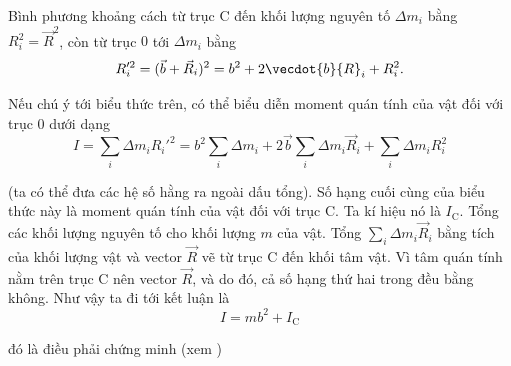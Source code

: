 Bình phương khoảng cách từ trục C đến khối lượng nguyên tố $\Delta m_i$ bằng $R_i^2=\vec{R}^2$, còn từ trục $0$ tới $\Delta m_i$ bằng
\begin{equation*}
R_i'^2 = (\vec{b} + \vec{R}_i)^2 = b^2 + 2\vecdot{b}{R}_i + R_i^2.
\end{equation*}

\noindent
Nếu chú ý tới biểu thức trên, có thể biểu diễn moment quán tính của vật đối với trục $0$ dưới dạng
\begin{equation}\label{eq:5_24}
I = \sum_i \Delta m_i R_i'^2 = b^2 \sum_i \Delta m_i + 2\vec{b} \sum_i \Delta m_i \vec{R}_i + \sum_i \Delta m_i R_i^2
\end{equation}

\noindent
(ta có thể đưa các hệ số hằng ra ngoài dấu tổng). Số hạng cuối cùng của biểu thức này là moment quán tính của vật đối với trục C. Ta kí hiệu nó là $I_{\text{C}}$. Tổng các khối lượng nguyên tố cho khối lượng $m$ của vật. Tổng $\sum_i\Delta m_i\vec{R}_i$ bằng tích của khối lượng vật và vector $\vec{R}$ vẽ từ trục C đến khối tâm vật. Vì tâm quán tính nằm trên trục C nên vector $\vec{R}$, và do đó, cả số hạng thứ hai trong  đều bằng không. Như vậy ta đi tới kết luận là
\begin{equation*}
I = mb^2 + I_{\text{C}}
\end{equation*}

\noindent
đó là điều phải chứng minh (xem )

